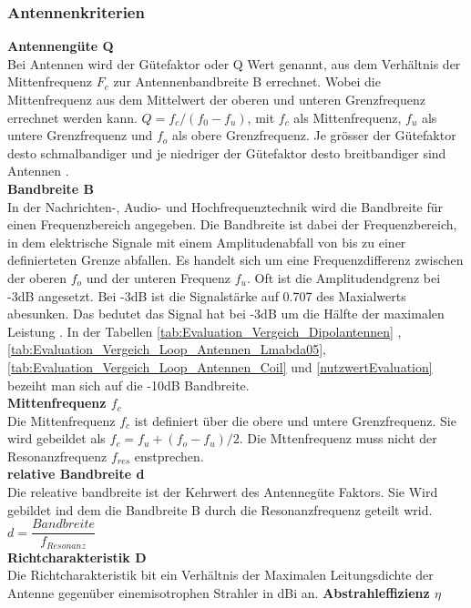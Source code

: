\subsubsection{Antennenkriterien}
\textbf{Antennengüte Q}\\
Bei Antennen wird der Gütefaktor oder Q Wert genannt, aus dem Verhältnis der Mittenfrequenz $F_{c}$ zur Antennenbandbreite B errechnet. Wobei die Mittenfrequenz aus dem Mittelwert der oberen und unteren Grenzfrequenz errechnet werden kann. $Q = f_c/(f_0-f_u)$, mit $f_c$ als Mittenfrequenz, $f_u$ als untere Grenzfrequenz und $f_o$ als obere Grenzfrequenz. Je grösser der Gütefaktor desto schmalbandiger und je niedriger der Gütefaktor  desto breitbandiger sind Antennen \cite{Guetefaktor_Q}.\\
\textbf{Bandbreite B}\\
In der Nachrichten-, Audio- und Hochfrequenztechnik wird die Bandbreite für einen Frequenzbereich angegeben. Die Bandbreite ist dabei der Frequenzbereich, in dem elektrische Signale mit einem Amplitudenabfall von bis zu einer definierteten Grenze abfallen. Es handelt sich um eine Frequenzdifferenz zwischen der oberen $f_o$ und der unteren Frequenz $f_u$. Oft ist die Amplitudendgrenz bei -3dB angesetzt. Bei -3dB ist die Signalstärke auf 0.707 des Maxialwerts abesunken. Das bedutet das Signal hat bei -3dB um die Hälfte der maximalen Leistung \cite{Bandbreite_B}.
In der Tabellen \ref{tab:Evaluation_Vergeich_Dipolantennen} ,\ref{tab:Evaluation_Vergeich_Loop_Antennen_Lmabda05}, \ref{tab:Evaluation_Vergeich_Loop_Antennen_Coil} und \ref{nutzwertEvaluation} bezeiht man sich auf die -10dB Bandbreite.\\
\textbf{Mittenfrequenz $f_{c}$}\\
Die Mittenfrequenz $f_c$ ist definiert über die obere und untere Grenzfrequenz. Sie wird gebeildet als $f_c=f_u+(f_o-f_u)/2$. Die Mttenfrequenz muss nicht der Resonanzfrequenz $f_{res}$ enstprechen.\\
\textbf{relative  Bandbreite d}\\
Die releative bandbreite ist der Kehrwert des Antennegüte Faktors.
Sie Wird gebildet ind dem die Bandbreite B durch die Resonanzfrequenz geteilt wrid. $d=\dfrac{Bandbreite}{f_{Resonanz}}$\\
\textbf{Richtcharakteristik D}\\
Die Richtcharakteristik bit ein Verhältnis der Maximalen Leitungsdichte der Antenne gegenüber einemisotrophen Strahler in dBi an.
\textbf{Abstrahleffizienz $\eta$}\\
